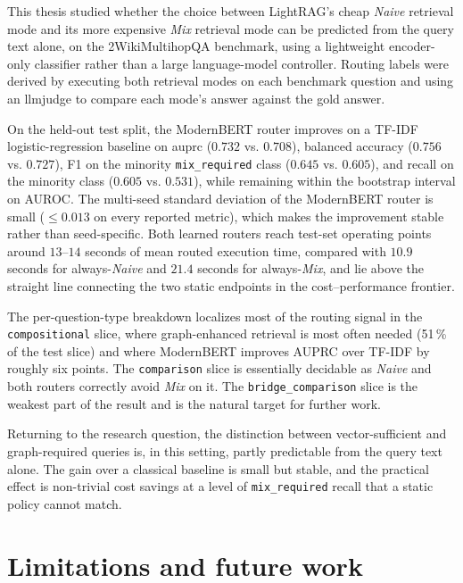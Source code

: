 \documentclass[english, bibtex]{kththesis}               %
\numberwithin{listing}{chapter}
\begin{document}
This thesis studied whether the choice between LightRAG's cheap \emph{Naive} retrieval mode and its more expensive \emph{Mix} retrieval mode can be predicted from the query text alone, on the 2WikiMultihopQA benchmark, using a lightweight encoder-only classifier rather than a large language-model controller. Routing labels were derived by executing both retrieval modes on each benchmark question and using an \gls{llmjudge} to compare each mode's answer against the gold answer.

On the held-out test split, the ModernBERT router improves on a TF-IDF logistic-regression baseline on \gls{auprc} ($0.732$ vs. $0.708$), balanced accuracy ($0.756$ vs. $0.727$), F1 on the minority \texttt{mix\_required} class ($0.645$ vs. $0.605$), and recall on the minority class ($0.605$ vs. $0.531$), while remaining within the bootstrap interval on AUROC. The multi-seed standard deviation of the ModernBERT router is small ($\leq 0.013$ on every reported metric), which makes the improvement stable rather than seed-specific. Both learned routers reach test-set operating points around $13$--$14$ seconds of mean routed execution time, compared with $10.9$ seconds for always-\emph{Naive} and $21.4$ seconds for always-\emph{Mix}, and lie above the straight line connecting the two static endpoints in the cost--performance frontier.

The per-question-type breakdown localizes most of the routing signal in the \texttt{compositional} slice, where graph-enhanced retrieval is most often needed (51\,\% of the test slice) and where ModernBERT improves AUPRC over TF-IDF by roughly six points. The \texttt{comparison} slice is essentially decidable as \emph{Naive} and both routers correctly avoid \emph{Mix} on it. The \texttt{bridge\_comparison} slice is the weakest part of the result and is the natural target for further work.

Returning to the research question, the distinction between vector-sufficient and graph-required queries is, in this setting, partly predictable from the query text alone. The gain over a classical baseline is small but stable, and the practical effect is non-trivial cost savings at a level of \texttt{mix\_required} recall that a static policy cannot match.

\section{Limitations and future work}
\label{sec:limitationsFutureWork}
\end{document}
